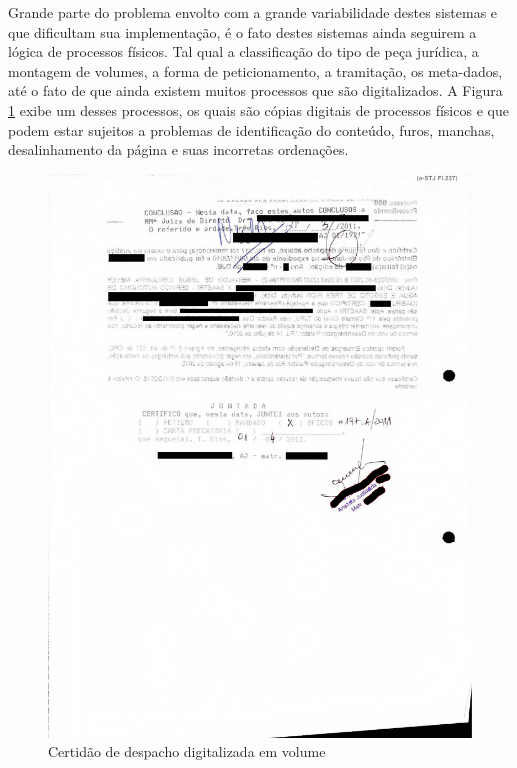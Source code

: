 Grande parte do problema envolto com a grande variabilidade destes sistemas e que dificultam sua implementação, é o fato destes sistemas ainda seguirem a lógica de processos físicos. Tal qual a classificação do tipo de peça jurídica, a montagem de volumes, a forma de peticionamento, a tramitação, os meta-dados, até o fato de que ainda existem muitos processos que são digitalizados. A Figura \ref{fig:bad_scan} exibe um desses processos, os quais são cópias digitais de processos físicos e que podem estar sujeitos a problemas de identificação do conteúdo, furos, manchas, desalinhamento da página e suas incorretas ordenações.

\begin{figure}[!ht]
	\centering
	\label{fig:bad_scan}
		\includegraphics[keepaspectratio=true,scale=0.3]{figuras/badScan}
	\caption{Certidão de despacho digitalizada em volume}
\end{figure}

